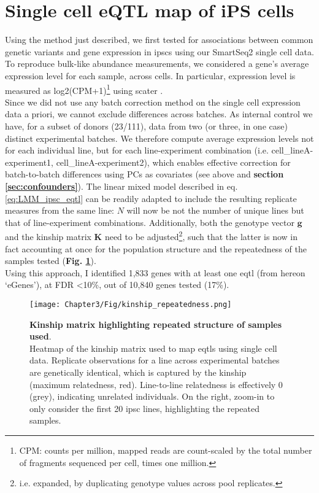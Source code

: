 \section{Single cell eQTL map of iPS cells}
\label{sec:sc_ipsc_eqtl}

Using the method just described, we first tested for associations between common genetic variants and gene expression in \glspl{ipsc} using our SmartSeq2 single cell data.
To reproduce bulk-like abundance measurements, we considered a gene's average expression level for each sample, across cells.
In particular, expression level is measured as log2(CPM+1)\footnote{CPM: counts per million, mapped reads are count-scaled by the total number of fragments sequenced per cell, times one million.} using scater \cite{mccarthy2017scater}.
\\

Since we did not use any batch correction method on the single cell expression data a priori, we cannot exclude differences across batches.
As internal control we have, for a subset of donors (23/111), data from two (or three, in one case) distinct experimental batches.
We therefore compute average expression levels not for each individual line, but for each line-experiment combination (i.e. cell\_lineA-experiment1, cell\_lineA-experiment2), which enables effective correction for batch-to-batch differences using PCs as covariates (see above and \textbf{section \ref{sec:confounders}}).
The linear mixed model described in eq. \eqref{eq:LMM_ipsc_eqtl} can be readily adapted to include the resulting replicate measures from the same line: $N$ will now be not the number of unique lines but that of line-experiment combinations.
Additionally, both the genotype vector $\mathbf{g}$ and the kinship matrix $\mathbf{K}$ need to be adjusted\footnote{i.e. expanded, by duplicating genotype values across pool replicates.}, such that the latter is now in fact accounting at once for the population structure and the repeatedness of the samples tested (\textbf{Fig. \ref{fig:kinship_repeats}}). \\

Using this approach, I identified 1,833 genes with at least one \gls{eqtl} (from hereon `eGenes'), at FDR <10\%, out of 10,840 genes tested (17\%). 

\begin{figure}[h]
\centering
\texttt{[image: Chapter3/Fig/kinship\_repeatedness.png]}
\caption[Kinship for repeated samples]{\textbf{Kinship matrix highlighting repeated structure of samples used}.\\
Heatmap of the kinship matrix used to map \glspl{eqtl} using single cell data.
Replicate observations for a line across experimental batches are genetically identical, which is captured by the kinship (maximum relatedness, red).
Line-to-line relatedness is effectively 0 (grey), indicating unrelated individuals. 
On the right, zoom-in to only consider the first 20 \gls{ipsc} lines, highlighting the repeated samples.}
\label{fig:kinship_repeats}
\end{figure}


